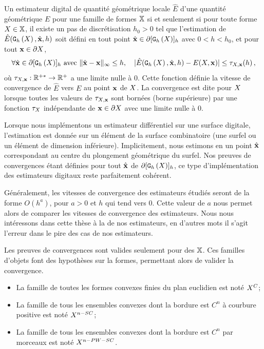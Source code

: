 \begin{definition}{}
  \label{def:multigrid-convergence-local}
  Un estimateur digital de quantité géométrique locale $\hat{E}$ d'une quantité géométrique
  $E$  pour une famille de formes $\mathbb{X}$ si
  et seulement si pour toute forme $X \in \mathbb{X}$, il existe un pas de
  discrétisation $h_0 > 0$ tel que l'estimation de $\hat{E}(\mathtt{G}_{h}\left(X\right),\hat{\mathbf{x}},h)$
  soit défini en tout point $\hat{\mathbf{x}} \in \partial \lbrack \mathtt{G}_{h}\left(X\right) \rbrack_{h}$ avec $0 < h < h_0$,
  et pour tout $\mathbf{x} \in \partial X$,
  \begin{equation}
    \forall \hat{\mathbf{x}} \in \partial\lbrack \mathtt{G}_{h}\left(X\right) \rbrack_{h} \text{~avec~} \| \hat{\mathbf{x}} -\mathbf{x}\|_\infty
    \le h, \quad | \hat{E}(\mathtt{G}_{h}\left(X\right),\hat{\mathbf{x}},h) - E(X,\mathbf{x}) | \le \tau_{X,\mathbf{x}}(h) \,,
  \end{equation}
  où $\tau_{X,\mathbf{x}}: \mathbb{R}^{+*} \rightarrow \mathbb{R}^+$ a une limite
  nulle à $0$. Cette fonction définie la vitesse de convergence de $\hat{E}$
  vers $E$ au point $\mathbf{x}$ de $X$. La convergence est dite
   pour $X$ lorsque toutes les valeurs de
  $\tau_{X,\mathbf{x}}$ sont bornées (borne supérieure) par une fonction
  $\tau_{X}$ indépendante de $\mathbf{x} \in \partial X$ avec une limite nulle à $0$.
\end{definition}

Lorsque nous implémentons un estimateur différentiel sur une surface digitale,
l'estimation est donnée sur un élément de la surface combinatoire (une surfel ou
un élément de dimension inférieure). Implicitement, nous estimons en un point
$\hat{\mathbf{x}}$ correspondant au centre du plongement géométrique du surfel. Nos
preuves de convergences étant définies pour tout $\hat{\mathbf{x}}$ de $\partial
\lbrack \mathtt{G}_{h}\left(X\right) \rbrack_{h}$, ce type d'implémentation des estimateurs digitaux reste
parfaitement cohérent.

Généralement, les vitesses de convergence des estimateurs étudiés seront de la
forme $O(h^a)$, pour $a > 0$ et $h$ qui tend vers $0$. Cette valeur de $a$ nous
permet alors de comparer les vitesses de convergence des estimateurs. Nous nous
intéressons dans cette thèse à la 
de nos estimateurs, en d'autres mots il s'agit l'erreur dans le pire des cas de
nos estimateurs.

Les preuves de convergences sont valides seulement pour des 
$\mathbb{X}$. Ces familles d'objets font des hypothèses sur la formes, permettant
alors de valider la convergence.
\begin{itemize}
  \item La famille de toutes les formes convexes finies du plan euclidien est noté $X^{C}$;
  \item La famille de tous les ensembles convexes dont la bordure est $C^n$ à courbure positive est noté $X^{n-SC}$;
  \item La famille de tous les ensembles convexes dont la bordure est $C^n$ par morceaux est noté $X^{n-PW-SC}$.
\end{itemize}
%
